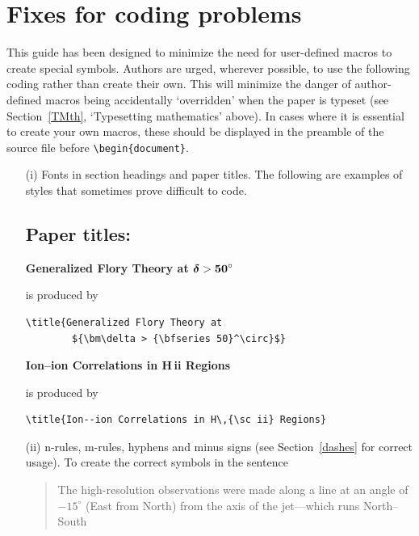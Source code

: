 \documentclass{tATO2e}
\begin{document}
\section{Fixes for coding problems}

This guide has been designed to minimize the need for user-defined macros to create special symbols. Authors
are urged, wherever possible, to use the following coding rather than create their own. This will minimize
the danger of author-defined macros being accidentally  `overridden' when the paper is typeset (see
Section~\ref{TMth}, `Typesetting mathematics' above). In cases where it is essential to create your own macros,
these should be displayed in the preamble of the source file before \verb"\begin{document}".

\begin{enumerate}
\item[(i)] Fonts in section headings and paper titles. The following are examples
of styles that sometimes prove difficult to code.

\subsection*{Paper titles:}

\bf{\noindent Generalized Flory Theory at ${\bm\delta >
{\bf 50}^\circ}$}

    \noindent\normalfont is produced by
\begin{verbatim}
\title{Generalized Flory Theory at
        ${\bm\delta > {\bfseries 50}^\circ}$}
\end{verbatim}
\medskip

{\bf{\noindent Ion--ion Correlations in H\,{\sc ii} Regions}}

\noindent\normalfont is produced by
%
\begin{verbatim}
\title{Ion--ion Correlations in H\,{\sc ii} Regions}
\end{verbatim}



\item[(ii)] n-rules, m-rules, hyphens and minus signs (see Section~\ref{dashes} for
correct usage). To create the correct symbols in the sentence

\begin{quote}
The high-resolution observations were made along a line at an
angle of $-15^\circ$ (East from North) from the axis of the
jet---which runs North--South
\end{quote}


\end{enumerate}
\end{document}
